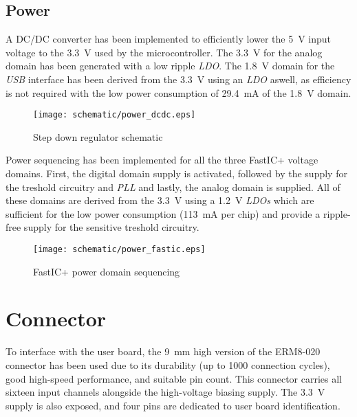 \subsection{Power}
A DC/DC converter has been implemented to efficiently lower the \SI{5}{\volt} input voltage to the \SI{3.3}{\volt} used by the microcontroller. The \SI{3.3}{\volt} for the analog domain has been generated with a low ripple \emph{LDO}. The \SI{1.8}{\volt} domain for the \emph{USB} interface has been derived from the \SI{3.3}{\volt} using an \emph{LDO} aswell, as efficiency is not required with the low power consumption of \SI{29.4}{\milli\ampere} of the \SI{1.8}{\volt} domain.
\FloatBarrier
\begin{figure}[htp!]
    \centering
    \texttt{[image: schematic/power\_dcdc.eps]}
    \caption{Step down regulator schematic}
    \label{fig:schem_dcdc}
\end{figure}
\FloatBarrier

Power sequencing has been implemented for all the three FastIC+ voltage domains. First, the digital domain supply is activated, followed by the supply for the treshold circuitry and \emph{PLL} and lastly, the analog domain is supplied. All of these domains are derived from the \SI{3.3}{\volt} using a \SI{1.2}{\volt} \emph{LDOs} which are sufficient for the low power consumption (\SI{113}{\milli\ampere} per chip) and provide a ripple-free supply for the sensitive treshold circuitry.

\FloatBarrier
\begin{figure}[htp!]
    \centering
    \texttt{[image: schematic/power\_fastic.eps]}
    \caption{FastIC+ power domain sequencing}
    \label{fig:schem_fastic_power}
\end{figure}
\FloatBarrier

\section{Connector}
To interface with the user board, the \SI{9}{\milli\meter} high version of the ERM8-020 connector has been used due to its durability (up to 1000 connection cycles), good high-speed performance, and suitable pin count. \cite{samtec_erm8_020_cycles} This connector carries all sixteen input channels alongside the high-voltage biasing supply. The \SI{3.3}{\volt} supply is also exposed, and four pins are dedicated to user board identification.
%
